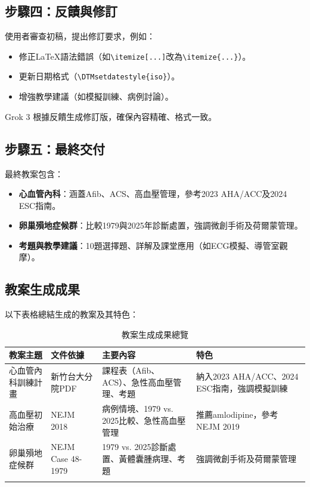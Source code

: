 \documentclass[12pt,a4paper]{article}
\begin{document}
\subsection{步驟四：反饋與修訂}
使用者審查初稿，提出修訂要求，例如：
\begin{itemize}[nosep]
    \item 修正LaTeX語法錯誤（如\verb|\itemize[...]|改為\verb|\itemize{...}|）。
    \item 更新日期格式（\verb|\DTMsetdatestyle{iso}|）。
    \item 增強教學建議（如模擬訓練、病例討論）。
\end{itemize}
Grok 3 根據反饋生成修訂版，確保內容精確、格式一致。

\subsection{步驟五：最終交付}
最終教案包含：
\begin{itemize}[nosep]
    \item \textbf{心血管內科}：涵蓋Afib、ACS、高血壓管理，參考2023 AHA/ACC及2024 ESC指南。
    \item \textbf{卵巢殞地症候群}：比較1979與2025年診斷處置，強調微創手術及荷爾蒙管理。
    \item \textbf{考題與教學建議}：10題選擇題、詳解及課堂應用（如ECG模擬、導管室觀摩）。
\end{itemize}

\subsection{教案生成成果}
以下表格總結生成的教案及其特色：

\begin{longtable}{|p{3cm}|p{4cm}|p{4cm}|p{4cm}|}
\hline
\textbf{教案主題} & \textbf{文件依據} & \textbf{主要內容} & \textbf{特色} \\
\hline
\endhead
心血管內科訓練計畫 & 新竹台大分院PDF & 課程表（Afib、ACS）、急性高血壓管理、考題 & 納入2023 AHA/ACC、2024 ESC指南，強調模擬訓練 \\
高血壓初始治療 & NEJM 2018 & 病例情境、1979 vs. 2025比較、急性高血壓管理 & 推薦amlodipine，參考NEJM 2019 \\
卵巢殞地症候群 & NEJM Case 48-1979 & 1979 vs. 2025診斷處置、黃體囊腫病理、考題 & 強調微創手術及荷爾蒙管理 \\
\bottomrule
\caption{教案生成成果總覽}
\end{longtable}

\vspace{0.5cm}
\end{document}
